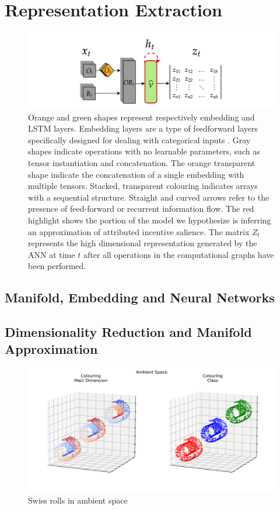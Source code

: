 \section{Representation Extraction}
\begin{figure}[h]
  \centering
  \includegraphics[width=\textwidth]{images/chapter_4/representation_extractor.png}
    \caption[\textbf{The procedure for generating latent representations generated by an ANN}]{Orange and green shapes represent respectively embedding and LSTM layers. Embedding layers are a type of feedforward layers specifically designed for dealing with categorical inputs \cite{chollet2015keras}. Gray shapes indicate operations with no learnable parameters, such as tensor instantiation and concatenation. The orange transparent shape indicate the concatenation of a single embedding with multiple tensors. Stacked, transparent colouring indicates arrays with a sequential structure. Straight and curved arrows refer to the presence of feed-forward or recurrent information flow. The red highlight shows the portion of the model we hypothesize is inferring an approximation of attributed incentive salience. The matrix $Z_t$ represents the high dimensional representation generated by the ANN at time $t$ after all operations in the computational graphs have been performed.}
    \label{fig: repr_exctracto}
    \end{figure}

\subsection{Manifold, Embedding and Neural Networks}
\lorem


\subsection{Dimensionality Reduction and Manifold Approximation}
\label{dim_reduction}
\begin{figure}[h]
  \centering
  \includegraphics[width=\textwidth]{images/chapter_4/ambient.png}
    \caption[\textbf{Swiss rolls in ambient space}]{Swiss rolls in ambient space}
    \label{fig: swiss_ambient}
\end{figure}


